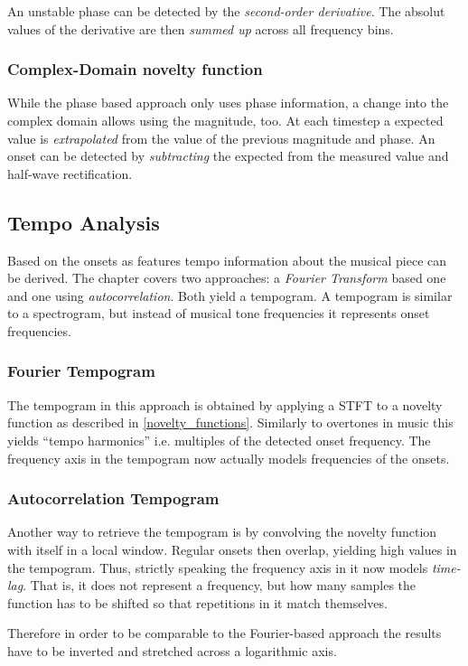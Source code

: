 \documentclass[a4paper, 9pt, twocolumn]{extarticle}
\begin{document}
An unstable phase can be detected
by the \emph{second-order derivative}. The absolut values of the derivative are then \emph{summed up}
across all frequency bins.

\subsubsection{Complex-Domain novelty function}
While the phase based approach only uses phase information, a change into the complex
domain allows using the magnitude, too. At each timestep a expected value is \emph{extrapolated}
from the value of the previous magnitude and phase. An onset can be detected by \emph{subtracting}
the expected from the measured value and half-wave rectification.


\subsection{Tempo Analysis}
Based on the onsets as features tempo information about the musical piece can be derived. The
chapter covers two approaches: a \emph{Fourier Transform} based one and one using
\emph{autocorrelation}. Both yield a tempogram. A tempogram is similar to a spectrogram, but
instead of musical tone frequencies it represents onset frequencies.

\subsubsection{Fourier Tempogram}
\label{fourier_tempogram}
The tempogram in this approach is obtained by applying a STFT to a novelty function as described
in \ref{novelty_functions}. Similarly to overtones in music this yields ``tempo harmonics''
i.e. multiples of the detected onset frequency. The frequency axis in the tempogram now
actually models frequencies of the onsets.

\subsubsection{Autocorrelation Tempogram}
Another way to retrieve the tempogram is by convolving the novelty function with itself
in a local window. Regular onsets then overlap, yielding high values in the tempogram. Thus, strictly
speaking the frequency axis in it now models \emph{time-lag}. That is, it does not represent
a frequency, but how many samples the function has to be shifted so that repetitions in it
match themselves.

Therefore in order to be comparable to the Fourier-based approach the results have to be
inverted and stretched across a logarithmic axis.
\end{document}
